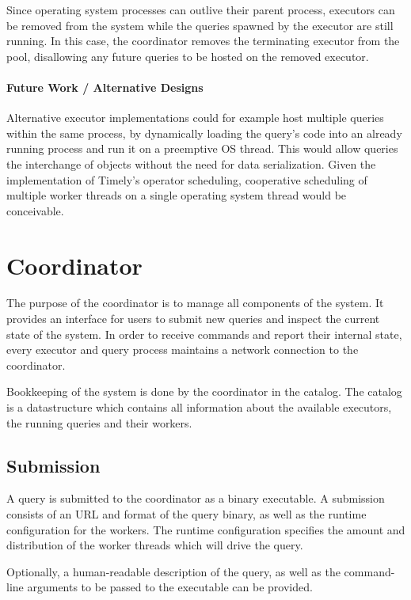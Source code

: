 Since operating system processes can outlive their parent process, executors can
be removed from the system while the queries spawned by the executor are still
running. In this case, the coordinator removes the terminating executor from
the pool, disallowing any future queries to be hosted on the removed executor.

\paragraph{Future Work / Alternative Designs}

Alternative executor implementations could for example host multiple queries
within the same process, by dynamically loading the query's code into an already
running process and run it on a preemptive OS thread. This would allow queries
the interchange of objects without the need for data serialization. Given
the implementation of Timely's operator scheduling, cooperative scheduling
of multiple worker threads on a single operating system thread would be
conceivable.

\section{Coordinator}

The purpose of the coordinator is to manage all components of the system. It
provides an interface for users to submit new queries and inspect the current
state of the system. In order to receive commands and report their internal state,
every executor and query process maintains a network connection to the coordinator.

Bookkeeping of the system is done by the coordinator in the catalog. The
catalog is a datastructure which contains all information about the available
executors, the running queries and their workers. 

\subsection{Submission}

A query is submitted to the coordinator as a binary executable. A submission
consists of an URL and format of the query binary, as well as the runtime
configuration for the workers. The runtime configuration specifies the amount
and distribution of the worker threads which will drive the query.

Optionally, a human-readable description of the query,
as well as the command-line arguments to be passed to the executable can be
provided. 

